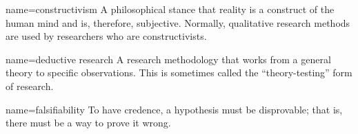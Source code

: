 






{name={constructivism}}
{%
	A philosophical stance that reality is a construct of the human mind and is, therefore, subjective. Normally, qualitative research methods are used by researchers who are constructivists.
}

{name={deductive research}}
{%
	A research methodology that works from a general theory to specific observations. This is sometimes called the ``theory-testing'' form of research.
}


{name={falsifiability}}
{%
	To have credence, a hypothesis must be disprovable; that is, there must be a way to prove it wrong.
}

